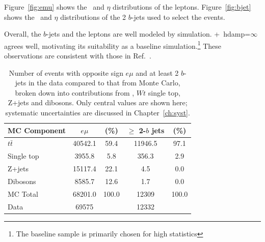 Figure~\ref{fig:emu} shows the \pt\ and $\eta$ distributions of the leptons. 
Figure~\ref{fig:bjet} shows the \pt\ and $\eta$ distributions of the 2 $b$-jets used to select the events. 

Overall, the $b$-jets and the leptons are well modeled by simulation. \pow+\py\ hdamp=$\infty$ agrees  well, motivating its suitability as a baseline simulation.\footnote{The baseline sample is primarily chosen for high statistics} These observations are consistent with those in Ref.~\cite{xsecnote}.

\begin{table}[htp]
\centering
\begin{tabular}{|l|cc|cc|}\hline
MC Component & $e\mu$ & (\%) & $\geq$ 2-$b$ jets & (\%) \\ \hline
$t\bar{t}$ 	& 40542.1	& 59.4 	& 11946.5 &	97.1 \\
Single top 	& 3955.8	& 5.8	& 356.3 &	2.9 \\
Z+jets 		& 15117.4 	& 22.1	& 4.5 	&	0.0 \\
Dibosons 	& 8585.7 	& 12.6 	& 1.7	&	0.0 \\
\hline
MC Total & 68201.0 & 100.0 & 12309	& 100.0 \\
\hline
Data & 69575 &  & 12332 &   \\
\hline \hline 
\end{tabular}
\caption{Number of events with opposite sign $e\mu$ and at least 2 $b$-jets in the data  compared to that from Monte Carlo, broken down into contributions from \ttbar, $Wt$ single top, Z+jets and dibosons. Only central values are shown here;  systematic uncertainties are discussed in Chapter~\ref{ch:syst}.}
\label{t:sel}
\end{table}

